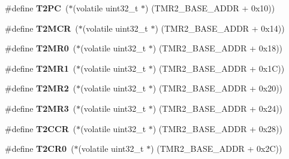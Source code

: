 \begin{DoxyCompactItemize}
\mbox{\label{group__lpc24xx__regs_gab0478579f7ce128c43a93b68a4974852}} 
\#define {\bfseries T2\+PC}~($\ast$(volatile uint32\+\_\+t $\ast$) (T\+M\+R2\+\_\+\+B\+A\+S\+E\+\_\+\+A\+D\+DR + 0x10))
\item 
\mbox{\label{group__lpc24xx__regs_ga8e86cc7926b1a34ccf96183f272ec8fc}} 
\#define {\bfseries T2\+M\+CR}~($\ast$(volatile uint32\+\_\+t $\ast$) (T\+M\+R2\+\_\+\+B\+A\+S\+E\+\_\+\+A\+D\+DR + 0x14))
\item 
\mbox{\label{group__lpc24xx__regs_gae9af312f9edd6c3e609484f9f6019456}} 
\#define {\bfseries T2\+M\+R0}~($\ast$(volatile uint32\+\_\+t $\ast$) (T\+M\+R2\+\_\+\+B\+A\+S\+E\+\_\+\+A\+D\+DR + 0x18))
\item 
\mbox{\label{group__lpc24xx__regs_ga94663f1f26d3d364e58e6d4908d4aa2c}} 
\#define {\bfseries T2\+M\+R1}~($\ast$(volatile uint32\+\_\+t $\ast$) (T\+M\+R2\+\_\+\+B\+A\+S\+E\+\_\+\+A\+D\+DR + 0x1\+C))
\item 
\mbox{\label{group__lpc24xx__regs_ga197b1f31bb466d13777cb3ec482420b8}} 
\#define {\bfseries T2\+M\+R2}~($\ast$(volatile uint32\+\_\+t $\ast$) (T\+M\+R2\+\_\+\+B\+A\+S\+E\+\_\+\+A\+D\+DR + 0x20))
\item 
\mbox{\label{group__lpc24xx__regs_gacce9129f30e5cef222f427e5b95caeb7}} 
\#define {\bfseries T2\+M\+R3}~($\ast$(volatile uint32\+\_\+t $\ast$) (T\+M\+R2\+\_\+\+B\+A\+S\+E\+\_\+\+A\+D\+DR + 0x24))
\item 
\mbox{\label{group__lpc24xx__regs_ga286928a67dcaa1d1e63bd9e75e49c7a8}} 
\#define {\bfseries T2\+C\+CR}~($\ast$(volatile uint32\+\_\+t $\ast$) (T\+M\+R2\+\_\+\+B\+A\+S\+E\+\_\+\+A\+D\+DR + 0x28))
\item 
\mbox{\label{group__lpc24xx__regs_ga8d54720a92350e4009551922372ccd4a}} 
\#define {\bfseries T2\+C\+R0}~($\ast$(volatile uint32\+\_\+t $\ast$) (T\+M\+R2\+\_\+\+B\+A\+S\+E\+\_\+\+A\+D\+DR + 0x2\+C))
\item 
\mbox{\label{group__lpc24xx__regs_gabf86f1bc7710b60615b29e1fb8ea09e1}} 

\end{DoxyCompactItemize}
